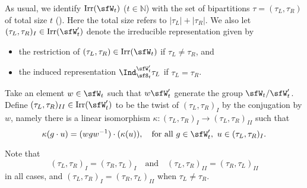 \documentclass[12pt]{amsart}
\def\abs#1{\left|{#1}\right|}
\newcommand{\BN}{{\mathbb {N}}}
\numberwithin{equation}{section}
\theoremstyle{remark}
\def\Irr{\mathrm{Irr}}
\begin{document}
 As usual, we identify $\Irr(\sfW_{t})$ ($t\in \BN$) with the set of bipartitions $\tau =(\tau_{L},\tau_{R})$ of total size $t$ (\cite[Section 11.4]{Carter}). Here the total size refers to
$\abs{\tau_{L}}+\abs{\tau_{R}}$.
We also let $(\tau_{L},\tau_{R})_{I}\in \Irr(\sfW'_t)$ denote the  irreducible representation  given by
  \begin{itemize}
    \item the restriction of $(\tau_{L},\tau_{R})\in \Irr(\sfW_{t})$  if
    $\tau_{L}\neq \tau_{R}$, and
    \item
    the induced representation
    $\Ind_{\sfS_{t}}^{\sfW'_{t}} \tau_{L}$ if $\tau_{L}=\tau_{R}$.
  \end{itemize}
  Take an element $w\in \sfW_t$ such that $w \sfW_t'$ generate the group $\sfW_t/\sfW'_t$. Define   $(\tau_{L},\tau_{R})_{II}\in \Irr(\sfW'_t)$ to be the twist of $(\tau_{L},\tau_{R})_{I}$ by the conjugation by $w$, namely there is a linear isomorphism $\kappa: (\tau_{L},\tau_{R})_{I}\rightarrow (\tau_{L},\tau_{R})_{II}$ such that
  \[
    \kappa(g\cdot u)= (wgw^{-1})\cdot (\kappa(u)), \quad \textrm{for all }g\in \sfW'_t, \ u\in (\tau_{L},\tau_{R})_{I}.
  \]


  Note that
  \[
     (\tau_{L},\tau_{R})_{I}=(\tau_{R},\tau_{L})_{I}\quad \textrm{and}\quad (\tau_{L},\tau_{R})_{II}=(\tau_{R},\tau_{L})_{II}
  \]
in all cases, and  $(\tau_{L},\tau_{R})_{I}=(\tau_{R},\tau_{L})_{II}$ when     $\tau_{L}\neq \tau_{R}$.
\end{document}
